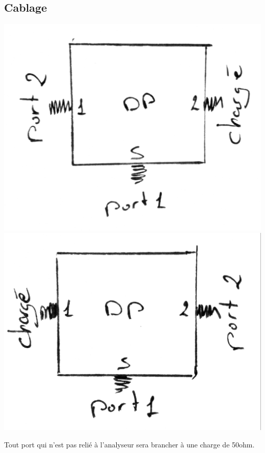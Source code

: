 \documentclass[a4paper,12pt]{report}            %
\begin{document}
\subsection{Cablage}
\begin{center}
	\includegraphics[scale = 0.15]{pic/DPS1.png}
      \includegraphics[scale = 0.15]{pic/DPS2.png}
\end{center}
Tout port qui n'est pas relié à l'analyseur sera brancher à une charge de 50ohm.
\newpage
\end{document}
